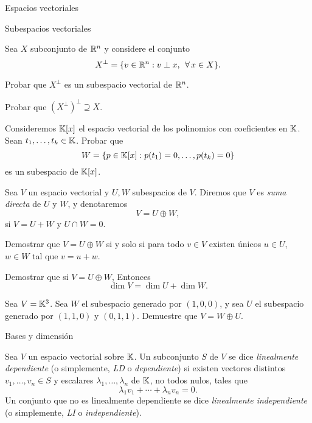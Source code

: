 \begin{chapter}{Espacios vectoriales}
\begin{section}{Subespacios vectoriales}
\begin{enumex}
        \item Sea $X$ subconjunto de $\mathbb R^n$ y  considere el conjunto 
            $$
            X^\perp = \{v \in \mathbb R^n: v \perp x,\; \, \forall\, x \in X\}. 
            $$
            \begin{enumex}
                \item Probar que $X^\perp$  es un subespacio vectorial de $\mathbb R^n$. 
                \item Probar que $(X^\perp)^\perp \supseteq X$.
            \end{enumex}
        \item\label{ejercicio-subespacios-polinomios} Consideremos $\mathbb K[x]$  el espacio vectorial de los polinomios con coeficientes en $\mathbb K$. Sean $t_1,\ldots,t_k \in \mathbb K$. Probar que 
        $$
         W = \{p \in \mathbb K[x]: p(t_1)=0, \ldots, p(t_k) =0\}
        $$
        es un subespacio de $\mathbb K[x]$.
        \item\label{ejercicio-suma-directa} Sea $V$ un espacio vectorial y $U,W$  subespacios de $V$. Diremos que $V$  es \textit{suma directa} de $U$ y $W$,  y denotaremos
        $$
        V = U \oplus W,
        $$
        si $V = U+W$ y $U \cap W =0$. 
            \begin{enumex}
                \item Demostrar que   $V = U \oplus W$ si y solo si para todo $v \in V$  existen únicos $u \in U$, $w \in W$ tal que $v=u+w$. 
                \item Demostrar que si $V = U \oplus W$,  Entonces
                $$
                \dim V = \dim U + \dim W.
                $$
            \end{enumex}
         
        \item  Sea $V = \mathbb K^3$. Sea $W$ el subespacio generado por $(1, 0, 0)$, y sea $U$ el subespacio generado por $(1, 1, 0)$ y $(0, 1, 1)$. Demuestre que $V = W \oplus U$.
    \end{enumex}

\end{section}	
        
\begin{section}{Bases y dimensi\'on}\label{seccion-bases-y-dimension}
    \begin{definicion}
        Sea $V$ un espacio vectorial sobre $\mathbb K$. Un subconjunto $S$ de $V$ se dice \textit{linealmente dependiente} (o simplemente, \textit{LD} o \textit{dependiente}) si existen vectores distintos $v_1,\ldots,v_n \in S$  y escalares $\lambda_1,\ldots,\lambda_n$ de $\mathbb K$, no todos nulos, tales que 	
        \begin{equation*}
            \lambda_1v_1+\cdots+\lambda_nv_n=0.
        \end{equation*}
        Un conjunto que no es linealmente dependiente se dice \textit{linealmente independiente} (o simplemente, \textit{LI} o \textit{independiente}).
        

\end{definicion}
\end{section}
\end{chapter}
